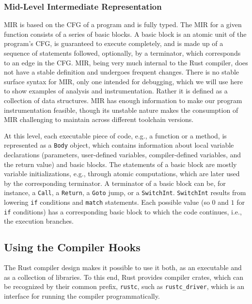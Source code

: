 \documentclass{article}
\begin{document}
\subsubsection{Mid-Level Intermediate Representation}
\ac{MIR} is based on the \ac{CFG} of a program and is fully typed. The \ac{MIR} for a given function consists of a series of basic blocks. A basic block is an atomic unit of the program's \ac{CFG}, is guaranteed to execute completely, and is made up of a sequence of statements followed, optionally, by a terminator, which corresponds to an edge in the \ac{CFG}. \ac{MIR}, being very much internal to the Rust compiler, does not have a stable definition and undergoes frequent changes. There is no stable surface syntax for \ac{MIR}, only one intended for debugging, which we will use here to show examples of analysis and instrumentation. Rather it is defined as a collection of data structures. \ac{MIR} has enough information to make our program instrumentation feasible, though its unstable nature makes the consumption of \ac{MIR} challenging to maintain across different toolchain versions.

At this level, each executable piece of code, e.g., a function or a method, is represented as a \lstinline{Body} object, which contains information about local variable declarations (parameters, user-defined variables, compiler-defined variables, and the return value) and basic blocks. The statements of a basic block are mostly variable initializations, e.g., through atomic computations, which are later used by the corresponding terminator. A terminator of a basic block can be,  for instance, a \lstinline{Call}, a \lstinline{Return}, a \lstinline{Goto} jump, or a \lstinline{SwitchInt}. \lstinline{SwitchInt} results from lowering \lstinline{if} conditions and \lstinline{match} statements. Each possible value (so $0$ and $1$ for \lstinline{if} conditions) has a corresponding basic block to which the code continues, i.e., the execution branches.

\subsection{Using the Compiler Hooks}
The Rust compiler design makes it possible to use it both, as an executable and as a collection of libraries. To this end, Rust provides compiler crates, which can be recognized by their common prefix, \lstinline{rustc}, such as \lstinline{rustc_driver}, which is an interface for running the compiler programmatically.
\end{document}
